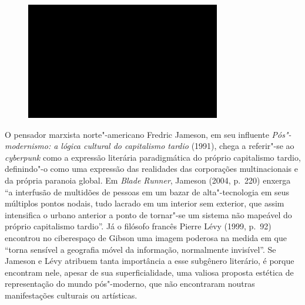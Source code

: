 \begin{figure}[!ht]

\centering
 \includegraphics[width=85mm]{./imgs/im1.jpg}
\caption{\tiny{}}

\end{figure}

O pensador marxista norte"-americano Fredric Jameson, em seu influente
\emph{Pós"-modernismo: a lógica cultural do capitalismo tardio} (1991),
chega a referir"-se ao \emph{cyberpunk} como a expressão literária
paradigmática do próprio capitalismo tardio, definindo"-o como uma
expressão das realidades das corporações multinacionais e da própria
paranoia global. Em \emph{Blade Runner}, Jameson (2004, p.~220) enxerga
``a interfusão de multidões de pessoas em um bazar de alta"-tecnologia em
seus múltiplos pontos nodais, tudo lacrado em um interior sem exterior,
que assim intensifica o urbano anterior a ponto de tornar"-se um sistema
não mapeável do próprio capitalismo tardio''. Já o filósofo francês Pierre
Lévy (1999, p.~92) encontrou no ciberespaço de Gibson uma imagem
poderosa na medida em que ``torna sensível a geografia móvel da
informação, normalmente invisível''. Se Jameson e Lévy atribuem tanta
importância a esse subgênero literário, é porque encontram nele, apesar
de sua superficialidade, uma valiosa proposta estética de representação
do mundo pós"-moderno, que não encontraram noutras manifestações
culturais ou artísticas.

